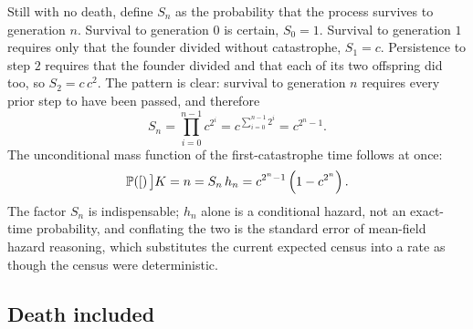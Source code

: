 Still with no death, define $S_n$ as the probability that the process survives
to generation $n$. Survival to generation $0$ is certain, $S_0=1$. Survival to
generation $1$ requires only that the founder divided without catastrophe,
$S_1=c$. Persistence to step $2$ requires that the founder divided and that each
of its two offspring did too, so $S_2 = c\,c^2$. The pattern is clear: survival
to generation $n$ requires every prior step to have been passed, and therefore
\begin{equation}
\label{m:eq:bdcS}
S_n = \prod_{i=0}^{n-1}c^{2^i}
= c^{\sum_{i=0}^{n-1}2^i}
= c^{2^n-1} .
\end{equation}
The unconditional mass function of the first-catastrophe time follows at once:
\begin{equation}
\label{m:eq:bdcfirst}
\mathbb{P}\!\left([\right)\big]{K = n} = S_n\,h_n = c^{2^n-1}\left(1-c^{2^n}\right) .
\end{equation}
The factor $S_n$ is indispensable; $h_n$ alone is a conditional hazard, not an
exact-time probability, and conflating the two is the standard error of
mean-field hazard reasoning, which substitutes the current expected census into a
rate as though the census were deterministic.

\subsection*{Death included}

